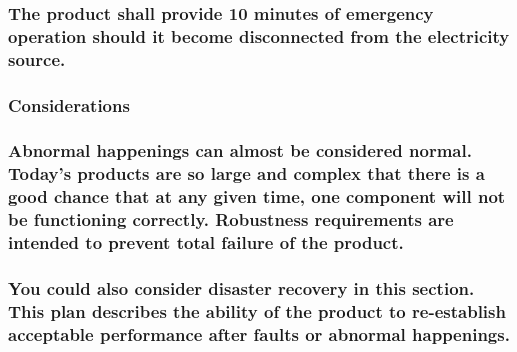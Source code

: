 \documentclass[
]{article}
\begin{document}
\hypertarget{the-product-shall-provide-10-minutes-of-emergency-operation-should-it-become-disconnected-from-the-electricity-source.}{%
\subsubsection{The product shall provide 10 minutes of emergency
operation should it become disconnected from the electricity
source.}\label{the-product-shall-provide-10-minutes-of-emergency-operation-should-it-become-disconnected-from-the-electricity-source.}}

\hypertarget{considerations-29}{%
\subsubsection{Considerations}\label{considerations-29}}

\hypertarget{abnormal-happenings-can-almost-be-considered-normal.-todays-products-are-so-large-and-complex-that-there-is-a-good-chance-that-at-any-given-time-one-component-will-not-be-functioning-correctly.-robustness-requirements-are-intended-to-prevent-total-failure-of-the-product.}{%
\subsubsection{\texorpdfstring{Abnormal happenings can almost be
considered normal. Today's products are so large and complex that there
is a good chance that at any given time, one component will not be
functioning correctly. Robustness requirements are intended to prevent
total failure of the product.
}{Abnormal happenings can almost be considered normal. Today's products are so large and complex that there is a good chance that at any given time, one component will not be functioning correctly. Robustness requirements are intended to prevent total failure of the product. }}\label{abnormal-happenings-can-almost-be-considered-normal.-todays-products-are-so-large-and-complex-that-there-is-a-good-chance-that-at-any-given-time-one-component-will-not-be-functioning-correctly.-robustness-requirements-are-intended-to-prevent-total-failure-of-the-product.}}

\hypertarget{you-could-also-consider-disaster-recovery-in-this-section.-this-plan-describes-the-ability-of-the-product-to-re-establish-acceptable-performance-after-faults-or-abnormal-happenings.}{%
\subsubsection{You could also consider disaster recovery in this
section. This plan describes the ability of the product to re-establish
acceptable performance after faults or abnormal
happenings.}\label{you-could-also-consider-disaster-recovery-in-this-section.-this-plan-describes-the-ability-of-the-product-to-re-establish-acceptable-performance-after-faults-or-abnormal-happenings.}}
\end{document}

